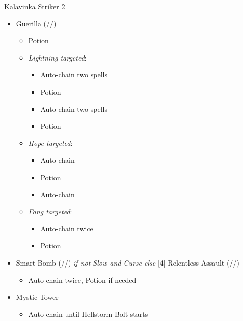 \begin{multicols}{2}
  \renewcommand{\first}{[1] Guerilla (\rav/\syn/\sab)}
  \renewcommand{\second}{[2] Smart Bomb (\rav/\rav/\sab)}
  \renewcommand{\third}{[3] Mystic Tower}
  \renewcommand{\fourth}{[4] Relentless Assault (\rav/\rav/\com)}
  \renewcommand{\fifth}{[5] Aggression (\com/\rav/\com)}
  \begin{battle}[1:28]{Kalavinka Striker 2}
    \begin{itemize}
      \item \first
            \begin{itemize}
              \item Potion
              \item \textit{Lightning targeted}:
                    \begin{itemize}
                      \item Auto-chain two spells
                      \item Potion
                      \item Auto-chain two spells
                      \item Potion
                    \end{itemize}
              \item \textit{Hope targeted}:
                    \begin{itemize}
                      \item Auto-chain
                      \item Potion
                      \item Auto-chain
                    \end{itemize}
              \item \textit{Fang targeted}:
                    \begin{itemize}
                      \item Auto-chain twice
                      \item Potion
                    \end{itemize}
            \end{itemize}
      \item \second \textit{ if not Slow and Curse else} \fourth
            \begin{itemize}
              \item Auto-chain twice, Potion if needed
            \end{itemize}
      \item \third
            \begin{itemize}
              \item Auto-chain until Hellstorm Bolt starts

\end{itemize}
\end{itemize}
\end{battle}
\end{multicols}
